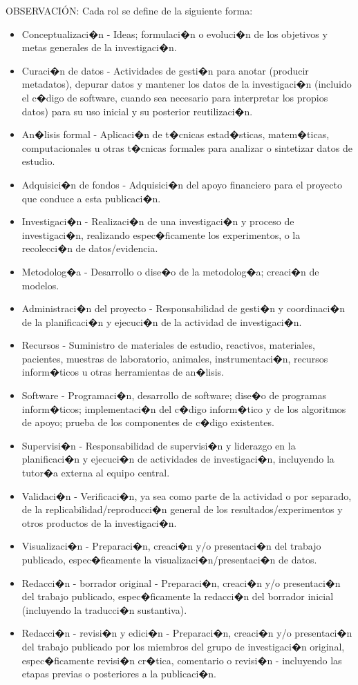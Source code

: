 \documentclass{rcci} %
\begin{document}
OBSERVACIÓN:
Cada rol se define de la siguiente forma:
\begin{itemize}
	\item Conceptualizaci�n - Ideas; formulaci�n o evoluci�n de los objetivos y metas generales de la investigaci�n.
	\item Curaci�n de datos - Actividades de gesti�n para anotar (producir metadatos), depurar datos y mantener los datos de la investigaci�n (incluido el c�digo de software, cuando sea necesario para interpretar los propios datos) para su uso inicial y su posterior reutilizaci�n.
	\item An�lisis formal - Aplicaci�n de t�cnicas estad�sticas, matem�ticas, computacionales u otras t�cnicas formales para analizar o sintetizar datos de estudio.
	\item Adquisici�n de fondos - Adquisici�n del apoyo financiero para el proyecto que conduce a esta publicaci�n.
	\item Investigaci�n - Realizaci�n de una investigaci�n y proceso de investigaci�n, realizando espec�ficamente los experimentos, o la recolecci�n de datos/evidencia.
	\item Metodolog�a - Desarrollo o dise�o de la metodolog�a; creaci�n de modelos.
	\item Administraci�n del proyecto - Responsabilidad de gesti�n y coordinaci�n de la planificaci�n y ejecuci�n de la actividad de investigaci�n.
	\item Recursos - Suministro de materiales de estudio, reactivos, materiales, pacientes, muestras de laboratorio, animales, instrumentaci�n, recursos inform�ticos u otras herramientas de an�lisis.
	\item Software - Programaci�n, desarrollo de software; dise�o de programas inform�ticos; implementaci�n del c�digo inform�tico y de los algoritmos de apoyo; prueba de los componentes de c�digo existentes.
	\item Supervisi�n - Responsabilidad de supervisi�n y liderazgo en la planificaci�n y ejecuci�n de actividades de investigaci�n, incluyendo la tutor�a externa al equipo central.
	\item Validaci�n - Verificaci�n, ya sea como parte de la actividad o por separado, de la replicabilidad/reproducci�n general de los resultados/experimentos y otros productos de la investigaci�n.
	\item Visualizaci�n - Preparaci�n, creaci�n y/o presentaci�n del trabajo publicado, espec�ficamente la visualizaci�n/presentaci�n de datos.
	\item Redacci�n - borrador original - Preparaci�n, creaci�n y/o presentaci�n del trabajo publicado, espec�ficamente la redacci�n del borrador inicial (incluyendo la traducci�n sustantiva).
	\item Redacci�n - revisi�n y edici�n - Preparaci�n, creaci�n y/o presentaci�n del trabajo publicado por los miembros del grupo de investigaci�n original, espec�ficamente revisi�n cr�tica, comentario o revisi�n - incluyendo las etapas previas o posteriores a la publicaci�n.
\end{itemize}
\end{document}
